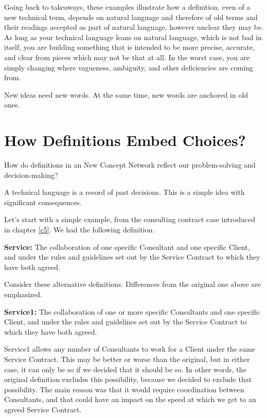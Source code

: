 \documentclass[graybox,envcountchap,sectrefs]{svmono}
\newcommand{\ncnf}{New Concept Network}
\begin{document}
Going back to takeaways, these examples illustrate how a definition, even of a new technical term, depends on natural language and therefore of old terms and their readings accepted as part of natural language, however unclear they may be. As long as your technical language leans on natural language, which is not bad in itself, you are building something that is intended to be more precise, accurate, and clear from pieces which may not be that at all. In the worst case, you are simply changing where vagueness, ambiguity, and other deficiencies are coming from.

New ideas need new words. At the same time, new words are anchored in old ones.



\section{How Definitions Embed Choices?}
\label{c6:s3}
How do definitions in an \ncnf{} reflect our problem-solving and decision-making?

A technical language is a record of past decisions. This is a simple idea with significant consequences.

Let's start with a simple example, from the consulting contract case introduced in chapter \ref{c5}. We had the following definition.

\begin{svgraybox}
\textbf{Service:} The collaboration of one specific Consultant and one specific Client, and under the rules and guidelines set out by the Service Contract to which they have both agreed.
\end{svgraybox}

Consider these alternative definitions. Differences from the original one above are emphasized.

\begin{svgraybox}
\textbf{Service1:} The collaboration of one or more specific Consultants and one specific Client, and under the rules and guidelines set out by the Service Contract to which they have both agreed.
\end{svgraybox}

Service1 allows any number of Consultants to work for a Client under the same Service Contract. This may be better or worse than the original, but in either case, it can only be so if we decided that it should be so. In other words, the original definition excludes this possibility, because we decided to exclude that possibility. The main reason was that it would require coordination between Consultants, and that could have an impact on the speed at which we get to an agreed Service Contract.
\end{document}
